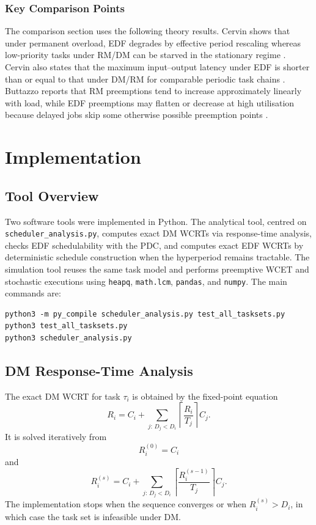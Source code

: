 \documentclass[11pt,a4paper]{article}
\begin{document}
\subsubsection{Key Comparison Points}
The comparison section uses the following theory results. Cervin shows that under permanent overload, EDF degrades by effective period rescaling whereas low-priority tasks under RM/DM can be starved in the stationary regime \cite{Cervin2003}. Cervin also states that the maximum input--output latency under EDF is shorter than or equal to that under DM/RM for comparable periodic task chains \cite{Cervin2003}. Buttazzo reports that RM preemptions tend to increase approximately linearly with load, while EDF preemptions may flatten or decrease at high utilisation because delayed jobs skip some otherwise possible preemption points \cite{Buttazzo2005}.

\section{Implementation}

\subsection{Tool Overview}
Two software tools were implemented in Python. The analytical tool, centred on \texttt{scheduler\_analysis.py}, computes exact DM WCRTs via response-time analysis, checks EDF schedulability with the PDC, and computes exact EDF WCRTs by deterministic schedule construction when the hyperperiod remains tractable. The simulation tool reuses the same task model and performs preemptive WCET and stochastic executions using \texttt{heapq}, \texttt{math.lcm}, \texttt{pandas}, and \texttt{numpy}. The main commands are:

\begin{verbatim}
python3 -m py_compile scheduler_analysis.py test_all_tasksets.py
python3 test_all_tasksets.py
python3 scheduler_analysis.py
\end{verbatim}

\subsection{DM Response-Time Analysis}
The exact DM WCRT for task \(\tau_i\) is obtained by the fixed-point equation \cite{Audsley1993,buttazzo2024}
\begin{equation}
R_i = C_i + \sum_{j:\,D_j < D_i} \left\lceil \frac{R_i}{T_j} \right\rceil C_j.
\tag{RTA}
\label{eq:rta}
\end{equation}
It is solved iteratively from
\begin{equation}
R_i^{(0)} = C_i
\label{eq:rta-init}
\end{equation}
and
\begin{equation}
R_i^{(s)} = C_i + \sum_{j:\,D_j < D_i} \left\lceil \frac{R_i^{(s-1)}}{T_j} \right\rceil C_j.
\label{eq:rta-iter}
\end{equation}
The implementation stops when the sequence converges or when \(R_i^{(s)} > D_i\), in which case the task set is infeasible under DM.
\end{document}
